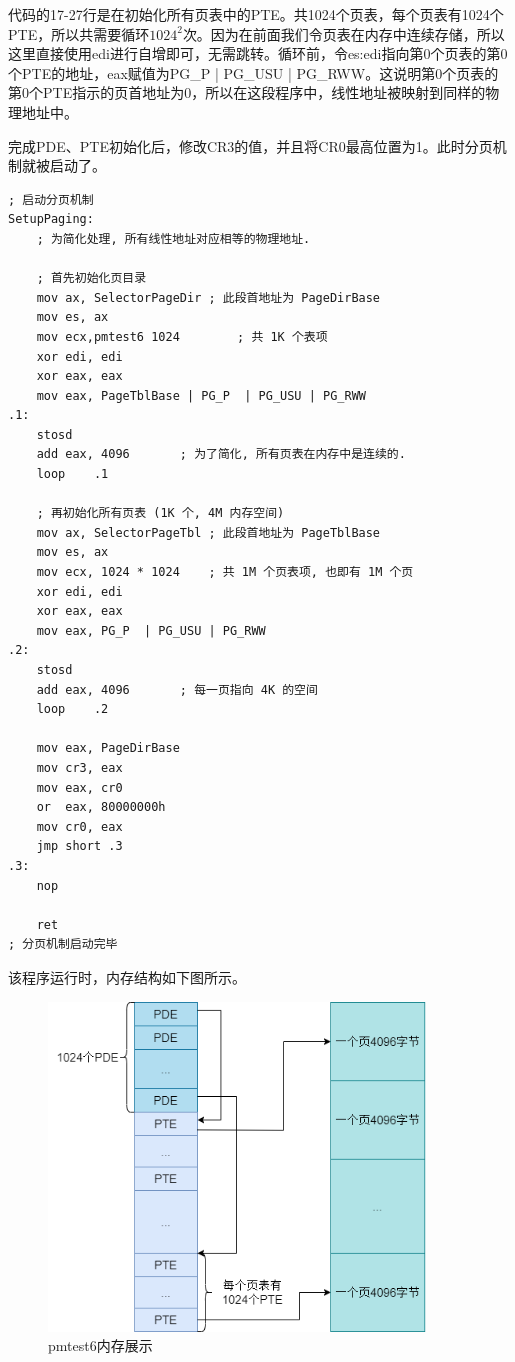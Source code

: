 \documentclass[UTF8,12pt]{ctexart}
\begin{document}
    代码的17-27行是在初始化所有页表中的PTE。共1024个页表，每个页表有1024个PTE，所以共需要循环$1024^2$次。因为在前面我们令页表在内存中连续存储，所以这里直接使用edi进行自增即可，无需跳转。循环前，令es:edi指向第0个页表的第0个PTE的地址，eax赋值为PG\_P | PG\_USU | PG\_RWW。这说明第0个页表的第0个PTE指示的页首地址为0，所以在这段程序中，线性地址被映射到同样的物理地址中。
    
    完成PDE、PTE初始化后，修改CR3的值，并且将CR0最高位置为1。此时分页机制就被启动了。
    
    \begin{lstlisting}[language={[x86masm]Assembler}]
    ; 启动分页机制 
SetupPaging:
	; 为简化处理, 所有线性地址对应相等的物理地址.

	; 首先初始化页目录
	mov	ax, SelectorPageDir	; 此段首地址为 PageDirBase
	mov	es, ax
	mov	ecx,pmtest6 1024		; 共 1K 个表项
	xor	edi, edi
	xor	eax, eax
	mov	eax, PageTblBase | PG_P  | PG_USU | PG_RWW
.1:
	stosd
	add	eax, 4096		; 为了简化, 所有页表在内存中是连续的.
	loop	.1

	; 再初始化所有页表 (1K 个, 4M 内存空间)
	mov	ax, SelectorPageTbl	; 此段首地址为 PageTblBase
	mov	es, ax
	mov	ecx, 1024 * 1024	; 共 1M 个页表项, 也即有 1M 个页
	xor	edi, edi
	xor	eax, eax
	mov	eax, PG_P  | PG_USU | PG_RWW
.2:
	stosd
	add	eax, 4096		; 每一页指向 4K 的空间
	loop	.2

	mov	eax, PageDirBase
	mov	cr3, eax
	mov	eax, cr0
	or	eax, 80000000h
	mov	cr0, eax
	jmp	short .3
.3:
	nop

	ret
; 分页机制启动完毕
    \end{lstlisting}
    
    该程序运行时，内存结构如下图所示。
    \begin{figure}[H]
        \centering
        \includegraphics[width=10cm]{images/pmtest6_mem.png}
        \caption{pmtest6内存展示}
        \label{pmtest6_mem}
    \end{figure}
    
\end{document}
